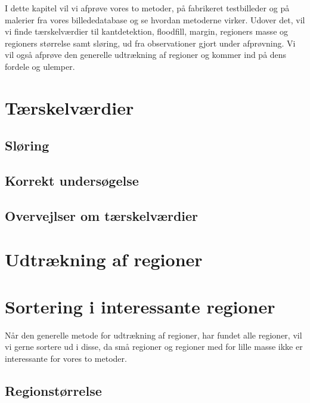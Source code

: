 {
{\sffamily
I dette kapitel vil vi afprøve vores to metoder, på fabrikeret
testbilleder og på malerier fra vores billededatabase og se hvordan
metoderne virker. Udover det, vil vi finde tærskelværdier til
kantdetektion, floodfill, margin, regioners masse og regioners størrelse
samt sløring, ud fra observationer gjort under afprøvning. Vi vil også
afprøve den generelle udtrækning af regioner og kommer ind på dens
fordele og ulemper.}

\section{Tærskelværdier\label{terskelverdi}}

\clearpage

\subsection{Sløring}

\clearpage

\subsection{Korrekt undersøgelse}


\subsection{Overvejlser om tærskelværdier}


\section{Udtrækning af regioner\label{region_detektor}}

\clearpage


\section{Sortering i interessante regioner}
{\sffamily Når den generelle metode for udtrækning af regioner, har
fundet alle regioner, vil vi gerne sortere ud i disse, da små
regioner og regioner med for lille masse ikke er interessante for vores
to metoder.
}

\subsection{Regionstørrelse \label{region_stoerlse}}

\clearpage

}
